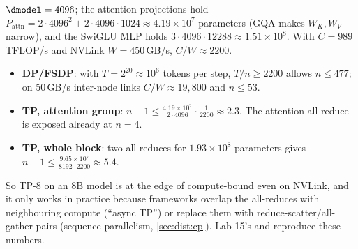 \begin{napkinmath}
$\dmodel=4096$; the attention projections hold $P_\text{attn} = 2\cdot4096^2 + 2\cdot4096\cdot1024
\approx 4.19\times10^7$ parameters (GQA makes $W_K, W_V$ narrow), and the SwiGLU MLP holds
$3\cdot4096\cdot12288\approx1.51\times10^8$. With $C=989$\,TFLOP/s and NVLink $W=450$\,GB/s,
$C/W\approx2200$.
\begin{itemize}
  \item \textbf{DP/FSDP}: with $T = 2^{20}\approx10^6$ tokens per step, $T/n \ge 2200$ allows
    $n\le 477$; on 50\,GB/s inter-node links $C/W\approx19{,}800$ and $n\le 53$.
  \item \textbf{TP, attention group}: $n-1 \le \frac{4.19\times10^7}{2\cdot4096}\cdot\frac{1}{2200}\approx2.3$.
    The attention all-reduce is exposed already at $n=4$.
  \item \textbf{TP, whole block}: two all-reduces for $1.93\times10^8$ parameters gives
    $n-1\le\frac{9.65\times10^7}{8192\cdot2200}\approx5.4$.
\end{itemize}
So TP-8 on an 8B model is at the edge of compute-bound even on NVLink, and it only works in
practice because frameworks overlap the all-reduces with neighbouring compute (``async TP'') or
replace them with reduce-scatter/all-gather pairs (sequence parallelism, \cref{sec:dist:cp}). Lab
15's  and  reproduce these numbers.
\end{napkinmath}

